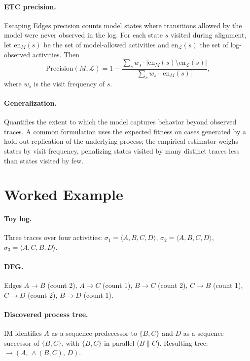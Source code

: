 \paragraph{ETC precision.} Escaping Edges precision counts model states
where transitions allowed by the model were never observed in the log.
For each state $s$ visited during alignment, let $\mathrm{en}_M(s)$ be the
set of model-allowed activities and $\mathrm{en}_{\mathcal{L}}(s)$ the
set of log-observed activities. Then
\begin{equation}
\mathrm{Precision}(M, \mathcal{L}) = 1 - \frac{\sum_s w_s \cdot
|\mathrm{en}_M(s) \setminus \mathrm{en}_{\mathcal{L}}(s)|}
{\sum_s w_s \cdot |\mathrm{en}_M(s)|},
\end{equation}
where $w_s$ is the visit frequency of $s$.

\paragraph{Generalization.} Quantifies the extent to which the model
captures behavior beyond observed traces. A common formulation uses the
expected fitness on cases generated by a hold-out replication of the
underlying process; the empirical estimator weighs states by visit
frequency, penalizing states visited by many distinct traces less than
states visited by few.


\section{Worked Example}
\label{app:I-examples}

\paragraph{Toy log.} Three traces over four activities:
$\sigma_1 = \langle A, B, C, D \rangle$,
$\sigma_2 = \langle A, B, C, D \rangle$,
$\sigma_3 = \langle A, C, B, D \rangle$.

\paragraph{DFG.} Edges $A \to B$ (count 2), $A \to C$ (count 1),
$B \to C$ (count 2), $C \to B$ (count 1), $C \to D$ (count 2),
$B \to D$ (count 1).

\paragraph{Discovered process tree.} IM identifies $A$ as a sequence
predecessor to $\{B, C\}$ and $D$ as a sequence successor of $\{B, C\}$,
with $\{B, C\}$ in parallel ($B \parallel C$). Resulting tree:
$\to(A,\, \wedge(B, C),\, D)$.


